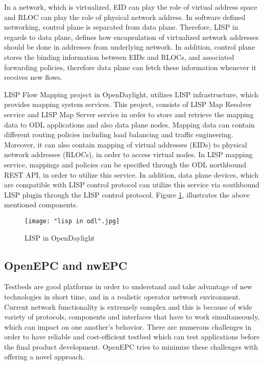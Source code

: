 In a network, which is virtualized, EID can play the role of virtual address space and RLOC can play the role of physical network address. In software defined networking, control plane is separated from data plane. Therefore, LISP in regards to data plane, defines how encapsulation of virtualized network addresses should be done in addresses from underlying network. In addition, control plane stores the binding information between EIDs and RLOCs, and associated forwarding policies, therefore data plane can fetch these information whenever it receives new flows. \cite{ODLLISP}  

LISP Flow Mapping project in OpenDaylight, utilizes LISP infrastructure, which provides mapping system services. This project, consists of LISP Map Resolver service and LISP Map Server service in order to store and retrieve the mapping data to ODL applications and  also data plane nodes. Mapping data can contain different routing policies including load balancing and traffic engineering. Moreover, it can also contain mapping of virtual addresses (EIDs) to physical network addresses (RLOCs), in order to access virtual nodes. In LISP mapping service, mappings and policies can be specified through the ODL northbound REST API, in order to utilize this service. In addition, data plane devices, which are compatible with LISP control protocol can utilize this service via southbound LISP plugin through the LISP control protocol. Figure \ref{fig:LispInODL}, illustrates the above mentioned components. 

\begin{figure}[h!t]
\centering
{}
\texttt{[image: "lisp in odl".jpg]}
\caption{LISP in OpenDaylight \cite{ODLLISP}}
\label{fig:LispInODL}
\end{figure}



\subsection{OpenEPC and nwEPC}

Testbeds are good platforms in order to understand and take advantage of new technologies in short time, and in a realistic operator network environment. Current network functionality is extremely complex and this is because of wide variety of protocols, components and interfaces that have to work simultaneously, which can impact on one another’s behavior. There are numerous challenges in order to have reliable and cost-efficient testbed which can test applications before the final product development. OpenEPC tries to minimize these challenges with offering a novel approach. \cite{OpenEPC}

